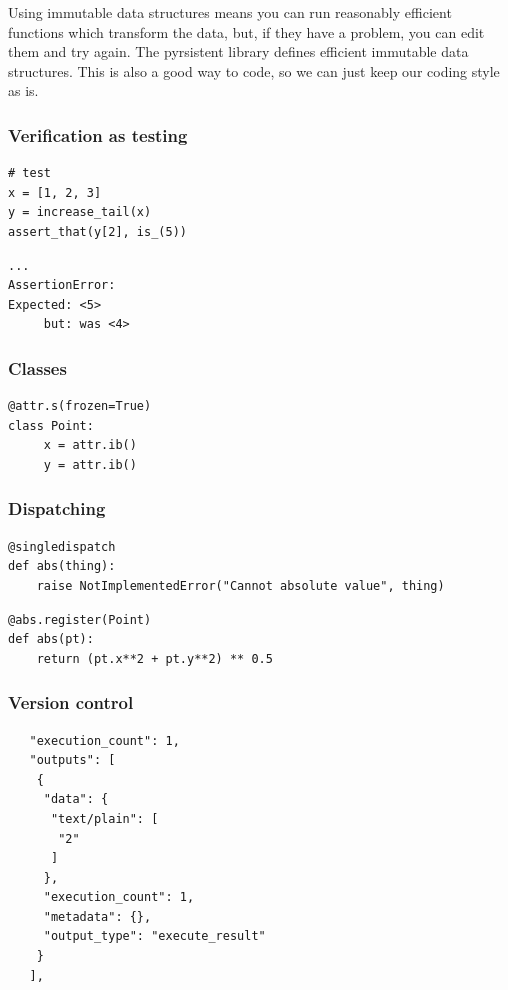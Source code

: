 Using immutable data structures means you can run
reasonably efficient functions which transform the data,
but,
if they have a problem,
you can edit them and try again.
The pyrsistent library defines efficient immutable data structures.
This is also a good way to code,
so we can just keep our coding style as is.

\begin{frame}[fragile]
\frametitle{Verification as testing}

\begin{lstlisting}[frame=single]
# test
x = [1, 2, 3]
y = increase_tail(x)
assert_that(y[2], is_(5))
\end{lstlisting}

\begin{lstlisting}[frame=single]
...
AssertionError: 
Expected: <5>
     but: was <4>
\end{lstlisting}

\end{frame}

\begin{frame}[fragile]
\frametitle{Classes}

\begin{lstlisting}[frame=single]
@attr.s(frozen=True)
class Point:
     x = attr.ib()
     y = attr.ib()
\end{lstlisting}


\end{frame}

\begin{frame}[fragile]
\frametitle{Dispatching}

\begin{lstlisting}[frame=single]
@singledispatch
def abs(thing):
    raise NotImplementedError("Cannot absolute value", thing)
\end{lstlisting}

\begin{lstlisting}[frame=single]
@abs.register(Point)
def abs(pt):
    return (pt.x**2 + pt.y**2) ** 0.5
\end{lstlisting}

\end{frame}

\begin{frame}[fragile]
\frametitle{Version control}

\begin{lstlisting}
   "execution_count": 1,
   "outputs": [
    {
     "data": {
      "text/plain": [
       "2"
      ]
     },
     "execution_count": 1,
     "metadata": {},
     "output_type": "execute_result"
    }
   ],
\end{lstlisting}

\end{frame}

